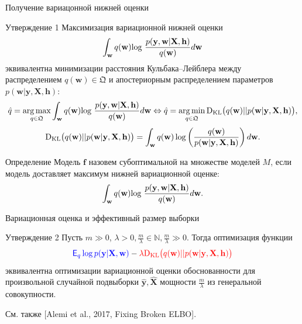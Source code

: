 \documentclass[usenames,dvipsnames,10pt,pdf,utf8,russian,aspectratio=43]{beamer}
\DeclareMathOperator*{\argmax}{arg\,max}
\DeclareMathOperator*{\argmin}{arg\,min}
\begin{document}
\begin{frame}{Получение вариацонной нижней оценки}
\small
\begin{block}{Утверждение 1} Максимизация вариационной нижней оценки $$\int_{\mathbf{w}} q(\mathbf{w})\textnormal{log}~\frac{p(\mathbf{y},\mathbf{w}|\mathbf{X},\mathbf{h})}{q(\mathbf{w})}d\mathbf{w}$$   эквивалентна минимизации расстояния Кульбака--Лейблера между распределением $q(\mathbf{w}) \in \mathfrak{Q}$ и апостериорным распределением параметров $p(\mathbf{w}|\mathbf{y}, \mathbf{X}, \mathbf{h})$:
\[
    \hat{q} = \argmax_{q \in \mathfrak{Q}} \int_{\mathbf{w}} q(\mathbf{w})\textnormal{log}~\frac{p(\mathbf{y},\mathbf{w}|\mathbf{X},\mathbf{h})}{q(\mathbf{w})}d\mathbf{w} \Leftrightarrow 	
    \hat{q} = \argmin_{q \in  \mathfrak{Q}} \textnormal{D}_\textnormal{KL}  \bigl(q(\mathbf{w})||p(\mathbf{w}|\mathbf{y}, \mathbf{X}, \mathbf{h})\bigr),
\]
\[
	\textnormal{D}_\textnormal{KL}  \bigl(q(\mathbf{w})||p(\mathbf{w}|\mathbf{y}, \mathbf{X}, \mathbf{h})\bigr) =  \int_\mathbf{w} q(\mathbf{w}) \log \left(\frac{q(\mathbf{w})}{p(\mathbf{w}|\mathbf{y}, \mathbf{X}, \mathbf{h})}\right) d\mathbf{w}.
\]

\end{block}


\begin{block}{Определение} Модель $\mathbf{f}$ назовем субоптимальной на множестве моделей $M$, если модель доставляет максимум нижней вариационной оценке:
\[
 \int_{\mathbf{w}} q(\mathbf{w})\textnormal{log}~\frac{p(\mathbf{y},\mathbf{w}|\mathbf{X},{\mathbf{h})}}{q(\mathbf{w})}d\mathbf{w}.
\]
\end{block}


\end{frame}

\begin{frame}{Вариационная оценка и эффективный размер выборки}
\begin{block}{Утверждение 2}
Пусть $m \gg 0$, $\lambda > 0, \frac{m}{\lambda}   \in \mathbb{N}, \frac{m}{\lambda}  \gg 0.$ Тогда оптимизация функции
\[
\textcolor{blue}{\mathsf{E}_{q} \log p(\mathbf{y}|\mathbf{X}, \mathbf{w})} - \textcolor{red}{\lambda \textnormal{D}_\textnormal{KL}  \bigl(q(\mathbf{w})||p(\mathbf{w}|\mathbf{y}, \mathbf{X}, \mathbf{h})\bigr)}
\]
 эквивалентна оптимизации вариационной оценки обоснованности  
для произвольной случайной подвыборки $\hat{\mathbf{y}}, \hat{\mathbf{X}}$ мощности $\frac{m}{{\lambda}}$ из генеральной совокупности.
\end{block}

См. также [Alemi et al., 2017, Fixing Broken ELBO].
\end{frame}
\end{document}
